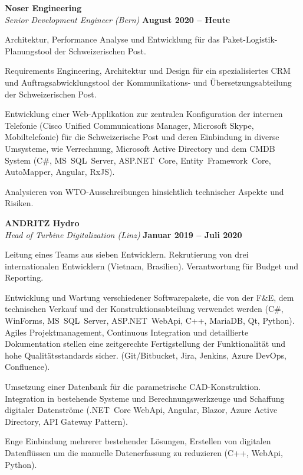 \documentclass[line,11pt,a4paper]{resume}
\begin{document}
\begin{resume}
\textbf{Noser Engineering}\\\vspace{1mm}%
\textsl{Senior Development Engineer (Bern)}
  \hfill \textbf{August 2020 -- Heute}\\
\vspace{-4mm}%
\begin{list2}
  \item Architektur, Performance Analyse und Entwicklung für das
    Paket-Logistik-Planungstool der Schweizerischen Post.
  \item Requirements Engineering, Architektur und Design für ein
    spezialisiertes CRM und Auftragsabwicklungstool der Kommunikations- und
    Übersetzungsabteilung der Schweizerischen Post.
  \item Entwicklung einer Web-Applikation zur zentralen Konfiguration der
    internen Telefonie (Cisco Unified Communications Manager, Microsoft
    Skype, Mobiltelefonie) für die Schweizerische Post und deren Einbindung
    in diverse Umsysteme, wie Verrechnung, Microsoft Active Directory
    und dem CMDB System (C\#, MS~SQL~Server, ASP.NET~Core, Entity~Framework~Core,
    AutoMapper, Angular, RxJS).
  \item Analysieren von WTO-Ausschreibungen hinsichtlich technischer Aspekte
    und Risiken.
\end{list2}

\textbf{ANDRITZ Hydro}\\\vspace{1mm}%
\textsl{Head of Turbine Digitalization (Linz)}
  \hfill \textbf{Januar 2019 -- Juli 2020}\\
\vspace{-4mm}%
\begin{list2}
  \item Leitung eines Teams aus sieben Entwicklern. Rekrutierung von drei
    internationalen Entwicklern (Vietnam, Brasilien). Verantwortung für Budget
    und Reporting.
  \item Entwicklung und Wartung verschiedener Softwarepakete, die von der F\&E,
    dem technischen Verkauf und der Konstruktionsabteilung verwendet werden
    (C\#, WinForms, MS~SQL~Server, ASP.NET~WebApi, C++, MariaDB, Qt, Python).
    Agiles Projektmanagement, Continuous Integration und detaillierte
    Dokumentation stellen eine zeitgerechte Fertigstellung der Funktionalität
    und hohe Qualitätsstandards sicher. (Git/Bitbucket, Jira, Jenkins, Azure
    DevOps, Confluence).
  \item Umsetzung einer Datenbank für die parametrische CAD-Konstruktion.
    Integration in bestehende Systeme und Berechnungswerkzeuge und Schaffung
    digitaler Datenströme (.NET~Core WebApi, Angular, Blazor, Azure Active
    Directory, API Gateway Pattern).
  \item Enge Einbindung mehrerer bestehender Lösungen, Erstellen von digitalen
    Datenflüssen um die manuelle Datenerfassung zu reduzieren (C++, WebApi,
    Python).
\end{list2}


\end{resume}
\end{document}
